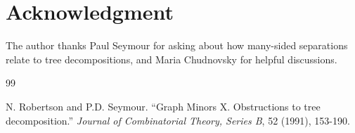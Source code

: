 \documentclass[12pt]{amsart}
\begin{document}

\section*{Acknowledgment}
The author thanks Paul Seymour for asking about how many-sided separations relate to tree decompositions, and Maria Chudnovsky for helpful discussions.
  \begin{thebibliography} {99}

 N. Robertson and P.D. Seymour. ``Graph Minors X. Obstructions to tree decomposition.'' {\em Journal of Combinatorial Theory, Series B}, 52 (1991),  153-190. \end{thebibliography}
\end{document}
